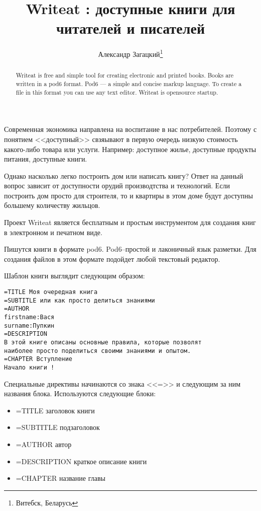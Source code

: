 \documentclass[10pt, a5paper]{article}
\begin{document}
\title{Writeat : доступные книги для читателей и писателей}%

\author{Александр Загацкий\footnote{Витебск, Беларусь}}
\maketitle

\begin{abstract}
Writeat is free and simple tool for creating electronic and printed books. Books are written in a pod6 format. Pod6 --- a simple and concise markup language. To create a file in this format you can use any text editor. Writeat is opensource startup.
\end{abstract}


Современная экономика направлена на воспитание в нас потребителей. Поэтому с 
понятием <<доступный>>  свзяывают в первую очередь низкую стоимость какого-либо 
товара или услуги. Например: доступное жилье, доступные продукты питания, 
доступные книги.

Однако насколько легко построить дом или написать книгу? Ответ на данный вопрос
зависит от доступности орудий производтства и технологий. Если построить дом просто для строителя, то и квартиры в этом доме будут доступны большему количеству жильцов.

Проект Writeat \cite{zag1} является бесплатным и простым инструментом для создания книг в 
электронном и печатном виде.

Пишутся книги в формате pod6. Pod6--простой и лаконичный язык разметки.
Для создания файлов в этом формате подойдет любой текстовый редактор.

Шаблон книги выглядит следующим образом:

\begin{verbatim}
=TITLE Моя очередная книга
=SUBTITLE или как просто делиться знаниями
=AUTHOR
firstname:Вася
surname:Пупкин
=DESCRIPTION
В этой книге описаны основные правила, которые позволят 
наиболее просто поделиться своими знаниями и опытом.
=CHAPTER Вступление
Начало книги !
\end{verbatim}

Специальные директивы начинаются со знака <<=>> и следующим за ним названия блока.
Используются следующие блоки:

\begin{itemize}
  \item[~] =TITLE   заголовок книги
  \item[~] =SUBTITLE подзаголовок
  \item[~] =AUTHOR автор
  \item[~] =DESCRIPTION краткое описание книги
  \item[~] =CHAPTER название главы
\end{itemize}
\end{document}
